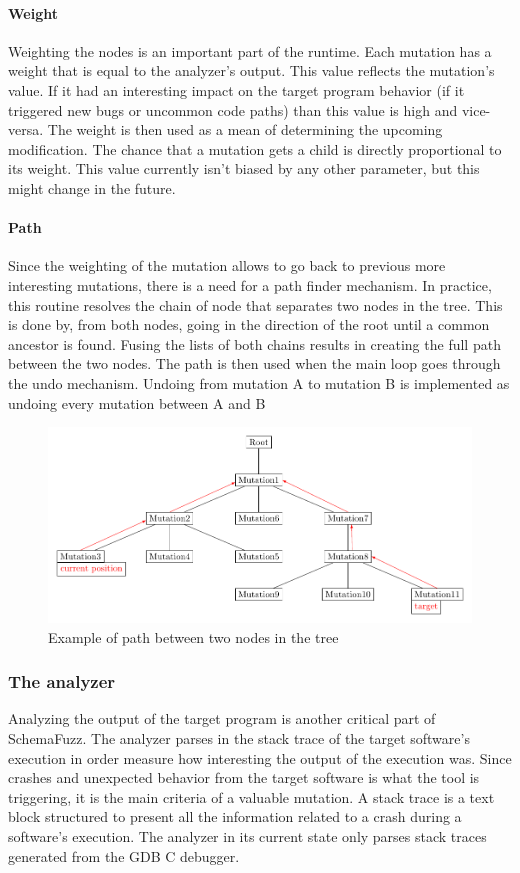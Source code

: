 \documentclass{article}
\begin{document}
\begin{empfile}
				\paragraph{Weight}
Weighting the nodes is an important part of the runtime. Each mutation has a weight that is equal to the analyzer's output. This value reflects the mutation's value. If it had an interesting impact on the target program behavior (if it triggered new bugs or uncommon code paths) than this value is high and vice-versa. The weight is then used as a mean of determining the upcoming modification. The chance that a mutation gets a child is directly proportional to its weight.
This value currently isn't biased by any other parameter, but this might change in the future.  
				\paragraph{Path} 
Since the weighting of the mutation allows to go back to previous more interesting mutations, 
there is a need for a path finder mechanism. In practice, this routine resolves the chain of node that separates two nodes in the tree. This is done by, from both nodes, going in the direction of the root until a common ancestor is found. Fusing the lists of both chains results in creating the full path between the two nodes. The path is then used when the main loop goes through the undo mechanism. Undoing from mutation A to mutation B is implemented as undoing every mutation between A and B

\bigskip

\begin{figure}[h!] 
\centering
\includegraphics[width=\textwidth]{CommonAncestorDiagram.pdf}
\caption{Example of path between two nodes in the tree}
\end{figure}

\bigskip
			\subsubsection{The analyzer}
Analyzing the output of the target program is another critical part of SchemaFuzz. The analyzer parses in the stack trace of the target software's execution in order measure how interesting the output of the execution was. Since crashes and unexpected behavior from the target software is what the tool is triggering, it is the main criteria of a valuable mutation. A stack trace is a text block structured to present all the information related to a crash during a software's execution. The analyzer in its current state only parses stack traces generated from the GDB C debugger.  

\end{empfile}
\end{document}
